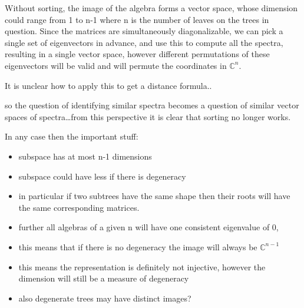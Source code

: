 \documentclass{report}
\begin{document}
Without sorting, the image of the algebra forms a vector space, whose dimension
could range from 1 to n-1 where n is the number of leaves on the trees in
question.
Since the matrices are simultaneously diagonalizable, we can pick a single set
of eigenvectors in advance, and use this to compute all the spectra, resulting
in a single vector space, however different permutations of these eigenvectors
will be valid and will permute the coordinates in $\mathds{C}^n$.

It is unclear how to apply this to get a distance formula..

so the question of identifying similar spectra becomes a question of similar
vector spaces of spectra\ldots from this perspective it is clear that sorting
no longer works.

In any case then the important stuff:
\begin{itemize}
	\item subspace has at most n-1 dimensions
	\item subspace could have less if there is degeneracy
	\item in particular if two subtrees have the same shape then their roots
		will have the same corresponding matrices.
	\item further all algebras of a given n will have one consistent
		eigenvalue of 0,
	\item this means that if there is no degeneracy the image will always be
		$\mathds{C}^{n-1}$
	\item this means the representation is definitely not injective, however
		the dimension will still be a measure of degeneracy
	\item also degenerate trees may have distinct images?
\end{itemize}
\end{document}
